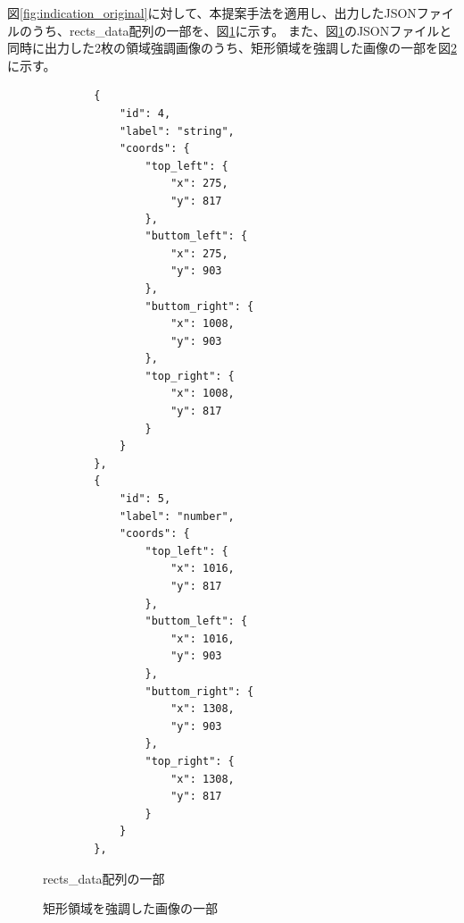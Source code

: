 図\ref{fig:indication_original}に対して、本提案手法を適用し、出力したJSONファイルのうち、rects\_data配列の一部を、図\ref{fig:rects_data_json}に示す。
また、図\ref{fig:rects_data_json}のJSONファイルと同時に出力した2枚の領域強調画像のうち、矩形領域を強調した画像の一部を図\ref{fig:highlighted_rects_part}に示す。

\lstset{language=}
\begin{figure}[t]
    \begin{lstlisting}
        {
            "id": 4,
            "label": "string",
            "coords": {
                "top_left": {
                    "x": 275,
                    "y": 817
                },
                "buttom_left": {
                    "x": 275,
                    "y": 903
                },
                "buttom_right": {
                    "x": 1008,
                    "y": 903
                },
                "top_right": {
                    "x": 1008,
                    "y": 817
                }
            }
        },
        {
            "id": 5,
            "label": "number",
            "coords": {
                "top_left": {
                    "x": 1016,
                    "y": 817
                },
                "buttom_left": {
                    "x": 1016,
                    "y": 903
                },
                "buttom_right": {
                    "x": 1308,
                    "y": 903
                },
                "top_right": {
                    "x": 1308,
                    "y": 817
                }
            }
        },
    \end{lstlisting}
    \caption{rects\_data配列の一部}\label{fig:rects_data_json}
\end{figure}

\begin{figure}[t]
    \begin{center}
        \caption{矩形領域を強調した画像の一部}
        \label{fig:highlighted_rects_part}
    \end{center}
\end{figure}

